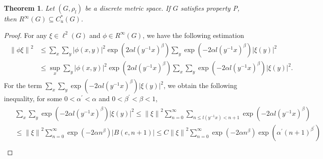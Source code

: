 \documentclass[preprint,11pt]{elsarticle}
\newtheorem{theorem}{Theorem}[section]
\numberwithin{equation}{section}
\begin{document}
	\begin{theorem}\label{subcontain}
		Let $\left ( G,\rho_{l }  \right )$ be a discrete metric space. If $G$ satisfies property P, then $R^{\infty }(G) \subseteq C_{u}^{*}(G)$.      
	\end{theorem}
	\begin{proof}
		For any $\xi\in \ell^{2}(G) $ and $\phi \in R^{\infty }(G)$, we have the following estimation
		\begin{align*}
			\begin{split}
				\left \| \phi \xi  \right \|^{2} %
				&\le  \sum _{x} \sum_{y}\left |\phi (x,y) \right | ^{2}\exp(2\alpha l(y^{-1}x)^{\beta }) \sum_{y} \exp(-2\alpha l(y^{-1}x)^{\beta })\left | \xi (y) \right | ^{2}\\
				&\le \sup _{x} \sum_{y}\left |\phi (x,y) \right | ^{2}\exp(2\alpha l(y^{-1}x)^{\beta })\sum_{x} \sum_{y} \exp(-2\alpha l(y^{-1}x)^{\beta })\left | \xi (y) \right | ^{2}.
			\end{split}
		\end{align*}
		For the term $\sum_{x} \sum_{y} \exp(-2\alpha l(y^{-1}x)^{\beta })\left | \xi (y) \right | ^{2}$, we obtain the following inequality, for some $0<\alpha^{'}<\alpha$ and $0<\beta^{'}<\beta<1 $,
		\begin{align*}
			\begin{split}
				&\sum_{x} \sum_{y} \exp(-2\alpha l(y^{-1}x)^{\beta })\left | \xi (y) \right | ^{2}
				\le \left \| \xi  \right \|^{2}\sum_{n=0}^{\infty } \sum _{n\le l(y^{-1}x)<n+1}\exp(-2\alpha l(y^{-1}x)^{\beta })\\
				&\le \left \| \xi  \right \|^{2}\sum _{n=0}^{\infty}\exp(-2\alpha n^{\beta })\left | B(e,n+1) \right |  
				\le C\left \| \xi  \right \|^{2} \sum _{n=0}^{\infty} \exp(-2\alpha n^{\beta })\exp(\alpha^{'} (n+1)^{\beta^{'} })\\

\end{split}
\end{align*}
\end{proof}
\end{document}

